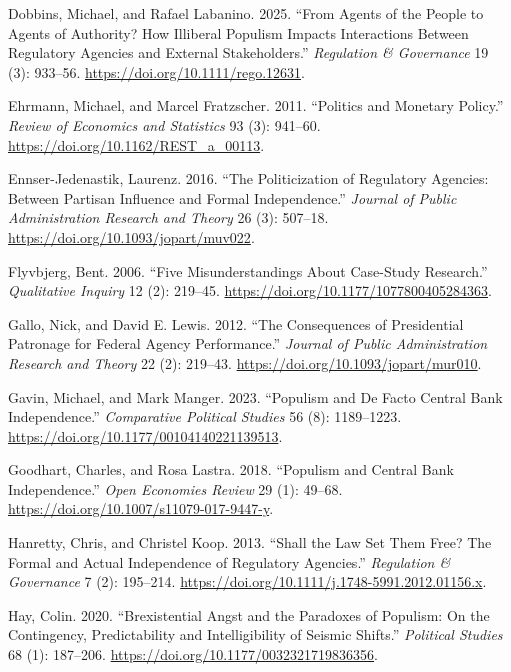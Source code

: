 \documentclass[
  11pt,
  letterpaper,
  DIV=11,
  numbers=noendperiod]{scrartcl}
\newlength{\cslhangindent}
\newenvironment{CSLReferences}[2] %
 {\begin{list}{}{%
  \setlength{\itemindent}{0pt}
  \setlength{\leftmargin}{0pt}
  \setlength{\parsep}{0pt}
  \ifodd #1
   \setlength{\leftmargin}{\cslhangindent}
   \setlength{\itemindent}{-1\cslhangindent}
  \fi
  \setlength{\itemsep}{#2\baselineskip}}}
 {\end{list}}
\begin{document}
\begin{CSLReferences}{1}{0}
Dobbins, Michael, and Rafael Labanino. 2025. {``From Agents of the
People to Agents of Authority? How Illiberal Populism Impacts
Interactions Between Regulatory Agencies and External Stakeholders.''}
\emph{Regulation \& Governance} 19 (3): 933--56.
\url{https://doi.org/10.1111/rego.12631}.

Ehrmann, Michael, and Marcel Fratzscher. 2011. {``Politics and Monetary
Policy.''} \emph{Review of Economics and Statistics} 93 (3): 941--60.
\url{https://doi.org/10.1162/REST_a_00113}.

Ennser-Jedenastik, Laurenz. 2016. {``The Politicization of Regulatory
Agencies: Between Partisan Influence and Formal Independence.''}
\emph{Journal of Public Administration Research and Theory} 26 (3):
507--18. \url{https://doi.org/10.1093/jopart/muv022}.

Flyvbjerg, Bent. 2006. {``Five Misunderstandings About Case-Study
Research.''} \emph{Qualitative Inquiry} 12 (2): 219--45.
\url{https://doi.org/10.1177/1077800405284363}.

Gallo, Nick, and David E. Lewis. 2012. {``The Consequences of
Presidential Patronage for Federal Agency Performance.''} \emph{Journal
of Public Administration Research and Theory} 22 (2): 219--43.
\url{https://doi.org/10.1093/jopart/mur010}.

Gavin, Michael, and Mark Manger. 2023. {``Populism and De Facto Central
Bank Independence.''} \emph{Comparative Political Studies} 56 (8):
1189--1223. \url{https://doi.org/10.1177/00104140221139513}.

Goodhart, Charles, and Rosa Lastra. 2018. {``Populism and Central Bank
Independence.''} \emph{Open Economies Review} 29 (1): 49--68.
\url{https://doi.org/10.1007/s11079-017-9447-y}.

Hanretty, Chris, and Christel Koop. 2013. {``Shall the Law Set Them
Free? The Formal and Actual Independence of Regulatory Agencies.''}
\emph{Regulation \& Governance} 7 (2): 195--214.
\url{https://doi.org/10.1111/j.1748-5991.2012.01156.x}.

Hay, Colin. 2020. {``Brexistential Angst and the Paradoxes of Populism:
On the Contingency, Predictability and Intelligibility of Seismic
Shifts.''} \emph{Political Studies} 68 (1): 187--206.
\url{https://doi.org/10.1177/0032321719836356}.


\end{CSLReferences}
\end{document}
